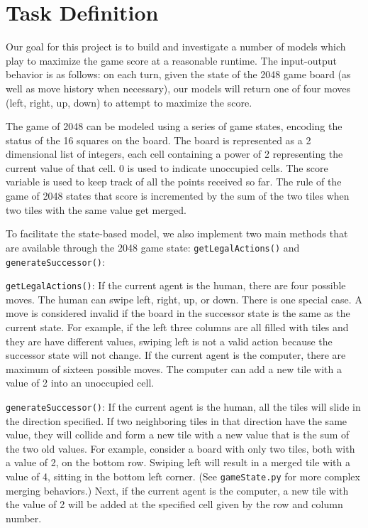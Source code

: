 \documentclass[9pt,twocolumn]{article}
\begin{document}
\section{Task Definition}

Our goal for this project is to build and investigate a number of models which play to maximize the game score at a reasonable runtime. The input-output behavior is as follows: on each turn, given the state of the 2048 game board (as well as move history when necessary), our models will return one of four moves (left, right, up, down) to attempt to maximize the score.

The game of 2048 can be modeled using a series of game states, encoding the status of the 16 squares on the board. The board is represented as a 2 dimensional list of integers, each cell containing a power of 2 representing the current value of that cell. 0 is used to indicate unoccupied cells. The score variable is used to keep track of all the points received so far. The rule of the game of 2048 states that score is incremented by the sum of the two tiles when two tiles with the same value get merged.

To facilitate the state-based model, we also implement two main methods that are available through the 2048 game state: \texttt{getLegalActions()} and \texttt{generateSuccessor()}:

\texttt{getLegalActions()}: If the current agent is the human, there are four possible moves. The human can swipe left, right, up, or down. There is one special case. A move is considered invalid if the board in the successor state is the same as the current state. For example, if the left three columns are all filled with tiles and they are have different values, swiping left is not a valid action because the successor state will not change. If the current agent is the computer, there are maximum of sixteen possible moves. The computer can add a new tile with a value of 2 into an unoccupied cell.

\texttt{generateSuccessor()}: If the current agent is the human, all the tiles will slide in the direction specified. If two neighboring tiles in that direction have the same value, they will collide and form a new tile with a new value that is the sum of the two old values. For example, consider a board with only two tiles, both with a value of 2, on the bottom row. Swiping left will result in a merged tile with a value of 4, sitting in the bottom left corner. (See \texttt{gameState.py} for more complex merging behaviors.) Next, if the current agent is the computer, a new tile with the value of 2 will be added at the specified cell given by the row and column number.
\end{document}
